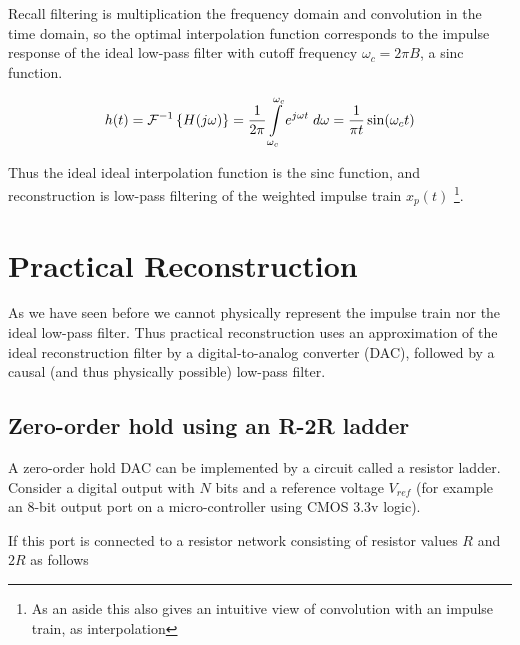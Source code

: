 Recall filtering is multiplication the frequency domain and convolution in the time domain, so the optimal interpolation function corresponds to the impulse response of the ideal low-pass filter with cutoff frequency $\omega_c = 2\pi B$, a sinc function.

\[
h(t) = \mathcal{F}^{-1} \left\{ H(j\omega) \right\} = \frac{1}{2\pi} \int\limits_{\-\omega_c}^{\omega_c} e^{j\omega t} \; d\omega = \frac{1}{\pi t}\sin(\omega_c t) 
\]

Thus the ideal ideal interpolation function is the sinc function, and reconstruction is low-pass filtering of the weighted impulse train $x_p(t)$ \footnote{As an aside this also gives an intuitive view of convolution with an impulse train, as interpolation}.

\section{Practical Reconstruction}

As we have seen before we cannot physically represent the impulse train nor the ideal low-pass filter. Thus practical reconstruction uses an approximation of the ideal reconstruction filter by a digital-to-analog converter (DAC), followed by a causal (and thus physically possible) low-pass filter.

\subsection{Zero-order hold using an R-2R ladder}

A zero-order hold DAC can be implemented by a circuit called a resistor ladder. Consider a digital output with $N$ bits and a reference voltage $V_{ref}$ (for example an 8-bit output port on a micro-controller using CMOS 3.3v logic).

If this port is connected to a resistor network consisting of resistor values $R$ and $2R$ as follows

